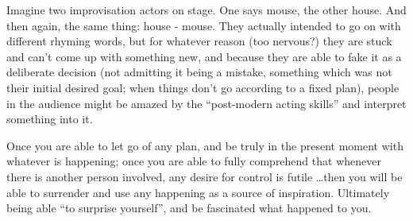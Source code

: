 Imagine two improvisation actors on stage.
One says mouse, the other house.
And then again, the same thing: house - mouse.
They actually intended to go on with different rhyming words, but for whatever reason (too nervous?) they are stuck and can't come up with something new, and because they are able to fake it as a deliberate decision (not admitting it being a mistake, something which was not their initial desired goal; when things don't go according to a fixed plan), people in the audience might be amazed by the ``post-modern acting skills'' and interpret something into it.

Once you are able to let go of any plan, and be truly in the present moment with whatever is happening; once you are able to fully comprehend that whenever there is another person involved, any desire for control is futile \ldots then you will be able to surrender and use any happening as a source of inspiration.
Ultimately being able ``to surprise yourself'', and be fascinated what happened to you.

